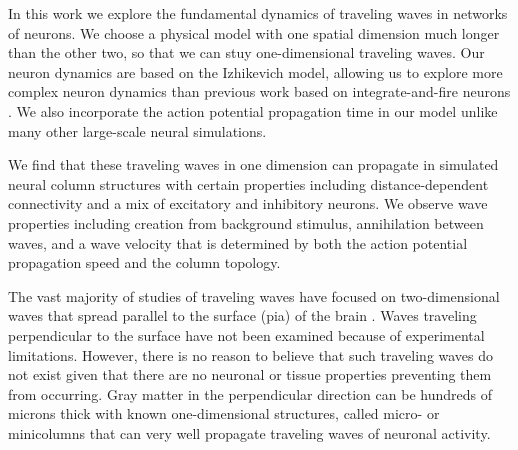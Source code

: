 \documentclass[a4paper,11pt]{article}
\begin{document}
In this work we explore the fundamental dynamics of traveling waves in networks of neurons.
We choose a physical model with one spatial dimension much longer than the other two, so that we can stuy one-dimensional traveling waves.
Our neuron dynamics are based on the Izhikevich model\cite{izhikevich2003}, allowing us to explore more complex neuron dynamics than previous work based on integrate-and-fire neurons \cite{keane2015}.
We also incorporate the action potential propagation time in our model unlike many other large-scale neural simulations.

We find that these traveling waves in one dimension can propagate in simulated neural column structures with certain properties including distance-dependent connectivity and a mix of excitatory and inhibitory neurons. 
We observe wave properties including creation from background stimulus, annihilation between waves, and a wave velocity that is determined by both the action potential propagation speed and the column topology. 

The vast majority of studies of traveling waves have focused on two-dimensional waves that spread parallel to the surface (pia) of the brain \cite{muller2018}. 
Waves traveling perpendicular to the surface have not been examined because of experimental limitations. 
However, there is no reason to believe that such traveling waves do not exist given that there are no neuronal or tissue properties preventing them from occurring. 
Gray matter in the perpendicular direction can be hundreds of microns thick with known one-dimensional structures, called micro- or minicolumns\cite{cruz2000} that can very well propagate traveling waves of neuronal activity.
\end{document}
